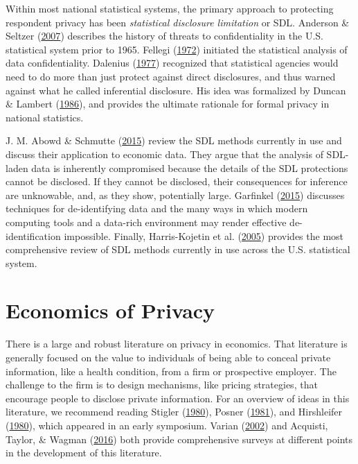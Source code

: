 \documentclass[]{article}
\begin{document}
Within most national statistical systems, the primary approach to
protecting respondent privacy has been \emph{statistical disclosure
limitation} or SDL. Anderson \& Seltzer
(\protect\hyperlink{ref-anderson:challenges:JOS:2007}{2007}) describes
the history of threats to confidentiality in the U.S. statistical system
prior to 1965. Fellegi (\protect\hyperlink{ref-Fellegi:1972}{1972})
initiated the statistical analysis of data confidentiality. Dalenius
(\protect\hyperlink{ref-Dalenius:Towards:1977}{1977}) recognized that
statistical agencies would need to do more than just protect against
direct disclosures, and thus warned against what he called inferential
disclosure. His idea was formalized by Duncan \& Lambert
(\protect\hyperlink{ref-Duncan:Lambert:1986}{1986}), and provides the
ultimate rationale for formal privacy in national statistics.

J. M. Abowd \& Schmutte
(\protect\hyperlink{ref-abowdschmutteBPEA2015}{2015}) review the SDL
methods currently in use and discuss their application to economic data.
They argue that the analysis of SDL-laden data is inherently compromised
because the details of the SDL protections cannot be disclosed. If they
cannot be disclosed, their consequences for inference are unknowable,
and, as they show, potentially large. Garfinkel
(\protect\hyperlink{ref-Garfinkel:Deidentification:NIST:2015}{2015})
discusses techniques for de-identifying data and the many ways in which
modern computing tools and a data-rich environment may render effective
de-identification impossible. Finally, Harris-Kojetin et al.
(\protect\hyperlink{ref-spwp22}{2005}) provides the most comprehensive
review of SDL methods currently in use across the U.S. statistical
system.

\hypertarget{economics-of-privacy}{\section{Economics of
Privacy}\label{economics-of-privacy}}

There is a large and robust literature on privacy in economics. That
literature is generally focused on the value to individuals of being
able to conceal private information, like a health condition, from a
firm or prospective employer. The challenge to the firm is to design
mechanisms, like pricing strategies, that encourage people to disclose
private information. For an overview of ideas in this literature, we
recommend reading Stigler
(\protect\hyperlink{ref-stigler1980introduction}{1980}), Posner
(\protect\hyperlink{ref-posner1981economics}{1981}), and Hirshleifer
(\protect\hyperlink{ref-hirshleifer1980privacy}{1980}), which appeared
in an early symposium. Varian (\protect\hyperlink{ref-Varian2002}{2002})
and Acquisti, Taylor, \& Wagman
(\protect\hyperlink{ref-acquisti:taylor:wagman:2015}{2016}) both provide
comprehensive surveys at different points in the development of this
literature.
\end{document}
